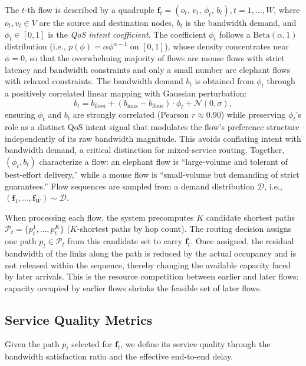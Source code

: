 The $t$-th flow is described by a quadruple $\mathbf{f}_t = (o_t,\, v_t,\, \phi_t,\, b_t), t=1,\dots,W $, where $o_t, v_t\in V$ are the source and destination nodes, $b_t$ is the bandwidth demand, and $\phi_t\in[0,1]$ is the \emph{QoS intent coefficient}. The coefficient $\phi_t$ follows a $\text{Beta}(\alpha, 1)$ distribution (i.e., $p(\phi)=\alpha\phi^{\alpha-1}$ on $[0,1]$), whose density concentrates near $\phi=0$, so that the overwhelming majority of flows are mouse flows with strict latency and bandwidth constraints and only a small number are elephant flows with relaxed constraints. The bandwidth demand $b_t$ is obtained from $\phi_t$ through a positively correlated linear mapping with Gaussian perturbation:
\begin{equation}
b_t = b_{\text{floor}} + (b_{\text{max}}-b_{\text{floor}})\cdot\phi_t + \mathcal{N}(0,\sigma),
\label{eq:bw_gen}
\end{equation}
ensuring $\phi_t$ and $b_t$ are strongly correlated (Pearson $r\approx 0.90$) while preserving $\phi_t$'s role as a distinct QoS intent signal that modulates the flow's preference structure independently of its raw bandwidth magnitude. This avoids conflating intent with bandwidth demand, a critical distinction for mixed-service routing.  Together, $(\phi_t, b_t)$ characterize a flow: an elephant flow is ``large-volume and tolerant of best-effort delivery,'' while a mouse flow is ``small-volume but demanding of strict guarantees.'' Flow sequences are sampled from a demand distribution $\mathcal{D}$, i.e., $(\mathbf{f}_1,\dots,\mathbf{f}_W)\sim\mathcal{D}$.

When processing each flow, the system precomputes $K$ candidate shortest paths $\mathcal{P}_t=\{p_t^{1},\dots,p_t^{K}\}$ ($K$-shortest paths by hop count). The routing decision assigns one path $p_t\in\mathcal{P}_t$ from this candidate set to carry $\mathbf{f}_t$. Once assigned, the residual bandwidth of the links along the path is reduced by the actual occupancy and is not released within the sequence, thereby changing the available capacity faced by later arrivals. This is the resource competition between earlier and later flows: capacity occupied by earlier flows shrinks the feasible set of later flows.

\subsection{Service Quality Metrics}
\label{sec:problem:metrics}

Given the path $p_t$ selected for $\mathbf{f}_t$, we define its service quality through the bandwidth satisfaction ratio and the effective end-to-end delay.

